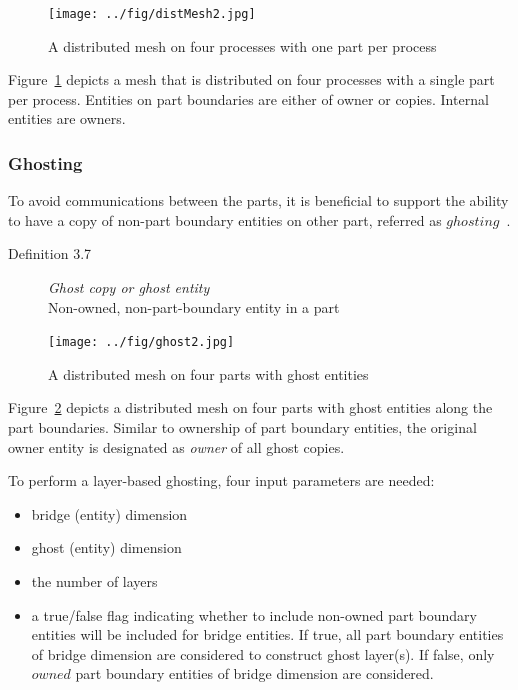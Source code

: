 \begin{figure}
\centering
\texttt{[image: ../fig/distMesh2.jpg]}
\caption[A distributed mesh on four processes with one part per process]{A distributed mesh on four processes with one part per process~\cite{itapsweb}}
\label{distMesh2}  %
\end{figure}

Figure~\ref{distMesh2} depicts a mesh that is distributed on four processes with a single part per process. Entities on part boundaries are either of owner or copies. Internal entities are owners.

\subsubsection{Ghosting}

To avoid communications between the parts, it is beneficial to support the ability to have a copy of non-part boundary entities on other part, referred as $ghosting$~\cite{itapsweb}.

\begin{description}
\item[Definition 3.7] \emph{Ghost copy or ghost entity}\\
Non-owned, non-part-boundary entity in a part
\end{description}

\begin{figure}
\centering
\texttt{[image: ../fig/ghost2.jpg]}
\caption[A distributed mesh on four parts with ghost entities]{A distributed mesh on four parts with ghost entities~\cite{itapsweb}}
\label{ghost}  %
\end{figure}

Figure~\ref{ghost} depicts a distributed mesh on four parts with ghost entities along the part boundaries. Similar to ownership of part boundary entities, the original owner entity is designated as \emph{owner} of all ghost copies.

To perform a layer-based ghosting, four input parameters are needed:
\begin{itemize}
\item bridge (entity) dimension
\item ghost (entity) dimension
\item the number of layers
\item a true/false flag indicating whether to include non-owned part boundary entities will be included for bridge entities. If true, all part boundary entities of bridge dimension are considered to construct ghost layer(s). If false, only $owned$ part boundary entities of bridge dimension are considered.
\end{itemize}

